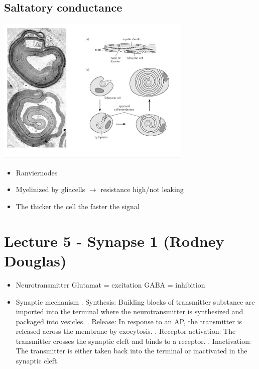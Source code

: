 \documentclass[english,11pt]{article}
\begin{document}
\subsection{Saltatory conductance}
\includegraphics[width=0.7\textwidth]{myelinized-axons.png}
\begin{itemize}
\item Ranviernodes 
\item Myelinized by gliacells $\rightarrow$ resistance high/not leaking
\item The thicker the cell the faster the signal
\end{itemize}

\section{Lecture 5 - Synapse 1 (Rodney Douglas)}
\begin{itemize}
\item Neurotransmitter
\subitem Glutamat = excitation
\subitem GABA = inhibition
\item Synaptic mechanism
. Synthesis: Building blocks of transmitter substance are imported into the terminal where the neurotransmitter is synthesized and packaged into vesicles.
. Release: In response to an AP, the transmitter is released across the membrane by exocytosis.
. Receptor activation: The transmitter crosses the synaptic cleft and binds to a receptor.
. Inactivation: The transmitter is either taken back into the terminal or inactivated in the synaptic cleft.

\end{itemize}
\end{document}
